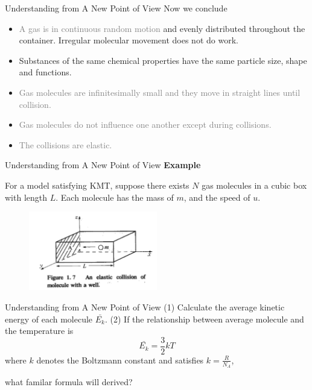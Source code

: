 \documentclass[12pt,compress]{beamer}
\begin{document}
\begin{frame}{Understanding from A New Point of View}
	Now we conclude
	\begin{itemize}
		\item \textcolor{gray}{A gas is in continuous random motion} and
		      evenly distributed throughout the container. Irregular molecular
		      movement does not do work.
		\item Substances of the same chemical properties have the same particle size,
		      shape and functions.
		\item \textcolor{gray}{Gas molecules are infinitesimally small and they move in straight
			      lines until collision.}
		\item \textcolor{gray}{Gas molecules do not influence one another except
			      during collisions.}
		\item \textcolor{gray}{The collisions are elastic.}
	\end{itemize}
\end{frame}
\begin{frame}{Understanding from A New Point of View}
	\textbf{Example}
	\par For a model satisfying KMT, suppose there exists $N$ gas molecules in a cubic box with length $L$. Each molecule has the mass of $m$,
	and the speed of $u$.
	\begin{figure}[!htbp]
		\centering
		\includegraphics[width=0.5\textwidth]{KMT.png}
	\end{figure}
\end{frame}
\begin{frame}{Understanding from A New Point of View}
	(1) Calculate the average kinetic energy of each molecule $\bar{E_k}$.
	(2) If the relationship between average molecule and the temperature is
	\begin{equation*}
		\bar{E_k} = \frac{3}{2}kT
	\end{equation*}
	where $k$ denotes the Boltzmann constant and satisfies $k = \frac{R}{N_A}$,
	\par what familar formula will derived?
\end{frame}
\end{document}
